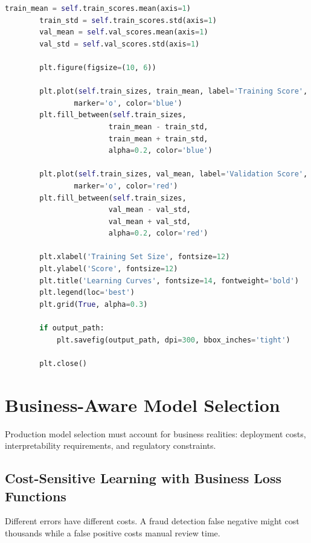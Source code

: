\begin{lstlisting}[language=Python, caption={Nested Cross-Validation Framework}]
        train_mean = self.train_scores.mean(axis=1)
        train_std = self.train_scores.std(axis=1)
        val_mean = self.val_scores.mean(axis=1)
        val_std = self.val_scores.std(axis=1)

        plt.figure(figsize=(10, 6))

        plt.plot(self.train_sizes, train_mean, label='Training Score',
                marker='o', color='blue')
        plt.fill_between(self.train_sizes,
                        train_mean - train_std,
                        train_mean + train_std,
                        alpha=0.2, color='blue')

        plt.plot(self.train_sizes, val_mean, label='Validation Score',
                marker='o', color='red')
        plt.fill_between(self.train_sizes,
                        val_mean - val_std,
                        val_mean + val_std,
                        alpha=0.2, color='red')

        plt.xlabel('Training Set Size', fontsize=12)
        plt.ylabel('Score', fontsize=12)
        plt.title('Learning Curves', fontsize=14, fontweight='bold')
        plt.legend(loc='best')
        plt.grid(True, alpha=0.3)

        if output_path:
            plt.savefig(output_path, dpi=300, bbox_inches='tight')

        plt.close()
\end{lstlisting}

\section{Business-Aware Model Selection}

Production model selection must account for business realities: deployment costs, interpretability requirements, and regulatory constraints.

\subsection{Cost-Sensitive Learning with Business Loss Functions}

Different errors have different costs. A fraud detection false negative might cost thousands while a false positive costs manual review time.

